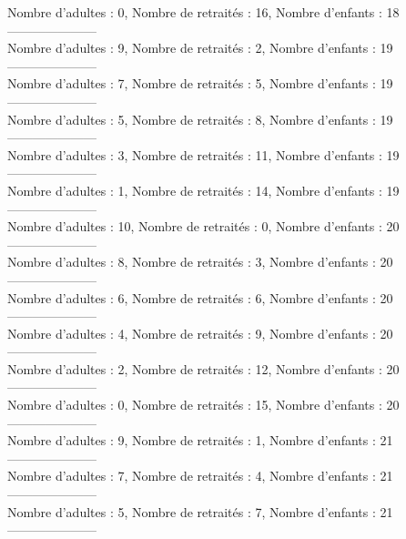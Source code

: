 \documentclass[10pt,a4paper]{article}
\begin{document}
Nombre d'adultes : 0, Nombre de retraités : 16, Nombre d'enfants : 18\\
---------------------\\
Nombre d'adultes : 9, Nombre de retraités : 2, Nombre d'enfants : 19\\
---------------------\\
Nombre d'adultes : 7, Nombre de retraités : 5, Nombre d'enfants : 19\\
---------------------\\
Nombre d'adultes : 5, Nombre de retraités : 8, Nombre d'enfants : 19\\
---------------------\\
Nombre d'adultes : 3, Nombre de retraités : 11, Nombre d'enfants : 19\\
---------------------\\
Nombre d'adultes : 1, Nombre de retraités : 14, Nombre d'enfants : 19\\
---------------------\\
Nombre d'adultes : 10, Nombre de retraités : 0, Nombre d'enfants : 20\\
---------------------\\
Nombre d'adultes : 8, Nombre de retraités : 3, Nombre d'enfants : 20\\
---------------------\\
Nombre d'adultes : 6, Nombre de retraités : 6, Nombre d'enfants : 20\\
---------------------\\
Nombre d'adultes : 4, Nombre de retraités : 9, Nombre d'enfants : 20\\
---------------------\\
Nombre d'adultes : 2, Nombre de retraités : 12, Nombre d'enfants : 20\\
---------------------\\
Nombre d'adultes : 0, Nombre de retraités : 15, Nombre d'enfants : 20\\
---------------------\\
Nombre d'adultes : 9, Nombre de retraités : 1, Nombre d'enfants : 21\\
---------------------\\
Nombre d'adultes : 7, Nombre de retraités : 4, Nombre d'enfants : 21\\
---------------------\\
Nombre d'adultes : 5, Nombre de retraités : 7, Nombre d'enfants : 21\\
---------------------\\
\end{document}
